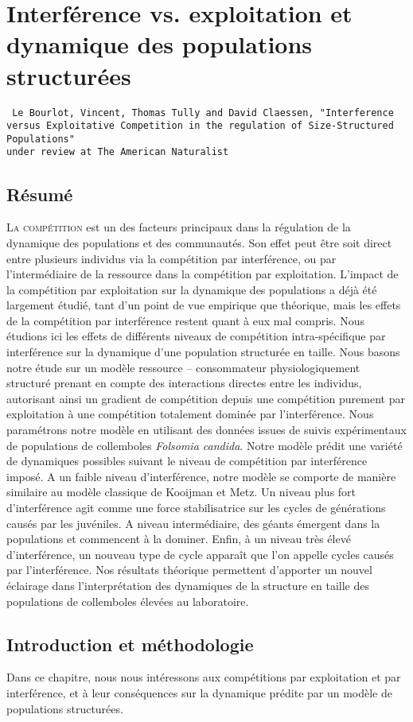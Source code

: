 \chapter[Interférence vs. exploitation et dynamique des populations
structurées][Interférence et populations structurées]{Interférence vs.
exploitation et dynamique des populations structurées}

\vspace{2cm}
\begin{Spacing}{1}
\texttt{
Le Bourlot, Vincent, Thomas Tully and David Claessen, "Interference versus
Exploitative Competition in the regulation of Size-Structured Populations"\\
under review at The American Naturalist
}
\end{Spacing}

\section*{Résumé}


\lettrine[lines=3]{L}{a compétition}  est un des facteurs principaux dans la
régulation de la dynamique des populations et des communautés. Son effet peut
être soit direct entre plusieurs individus via la compétition par
interférence, ou par l'intermédiaire de la ressource dans la compétition par
exploitation. L'impact de la compétition par exploitation sur la dynamique des
populations a déjà été largement étudié, tant d'un point de vue empirique
que théorique, mais les effets de la compétition par interférence restent
quant à eux mal compris. Nous étudions ici les effets de différents niveaux
de compétition intra-spécifique par interférence sur la dynamique d'une
population structurée en taille. Nous basons notre étude sur un modèle
ressource -- consommateur physiologiquement structuré prenant en compte des
interactions directes entre les individus, autorisant ainsi un gradient de
compétition depuis une compétition purement par exploitation à une
compétition totalement dominée par l'interférence. Nous paramétrons notre
modèle en utilisant des données issues de suivis expérimentaux de populations
de collemboles \textit{Folsomia candida}. Notre modèle prédit une variété de
dynamiques possibles suivant le niveau de compétition par interférence
imposé. A un faible niveau d'interférence, notre modèle se comporte de
manière similaire au modèle classique de Kooijman et Metz. Un niveau plus fort
d'interférence agit comme une force stabilisatrice sur les cycles de
générations causés par les juvéniles. A niveau intermédiaire, des géants
émergent dans la populations et commencent à la dominer. Enfin, à un niveau
très élevé d'interférence, un nouveau type de cycle apparaît que l'on
appelle cycles causés par l'interférence. Nos résultats théorique permettent
d'apporter un nouvel éclairage dans l'interprétation des dynamiques de la
structure en taille des populations de collemboles élevées au laboratoire.

\section{Introduction et méthodologie}

Dans ce chapitre, nous nous intéressons aux compétitions par exploitation et
par interférence, et à leur conséquences sur la dynamique prédite par un modèle
de populations structurées.


